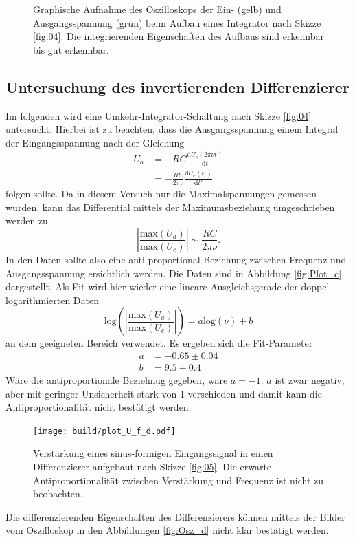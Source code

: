 \begin{figure}
\begin{subfigure}{0.35\textwidth}
  \end{subfigure}
  \caption{Graphische Aufnahme des Oszilloskops der Ein- (gelb) und Ausgangsspannung (grün) beim Aufbau eines Integrator nach Skizze \ref{fig:04}. Die integrierenden Eigenschaften des Aufbaus sind erkennbar bis gut erkennbar.}
  \label{fig:Osz_c}
\end{figure}

\subsection{Untersuchung des invertierenden Differenzierer}
Im folgenden wird eine Umkehr-Integrator-Schaltung nach Skizze \ref{fig:04} untersucht. Hierbei ist zu beachten, dass die Ausgangsspannung einem Integral der Eingangsspannung nach der Gleichung
\begin{align}
  U_a &= -RC\frac{\text{d}U_e(2\pi \nu t)}{\text{d}t}\\
      &= -\frac{RC}{2\pi\nu} \frac{\text{d}U_e(t')}{\text{d}t'}
\end{align}
folgen sollte. Da in diesem Versuch nur die Maximalspannungen gemessen wurden, kann das Differential mittels der Maximumsbeziehung umgeschrieben werden zu
\begin{equation}
  \left|\frac{\text{max}\left(U_a\right)}{\text{max}\left(U_e\right)}\right| \sim \frac{RC}{2\pi\nu}.
\end{equation}
In den Daten sollte also eine anti-proportional Beziehnug zwischen Frequenz und Ausgangsspannung ersichtlich werden. Die Daten sind in Abbildung \ref{fig:Plot_c} dargestellt. Als Fit wird hier wieder eine lineare Ausgleichsgerade der doppel-logarithmierten Daten
\begin{equation}
  \text{log}\left(\left|\frac{\text{max}\left(U_a\right)}{\text{max}\left(U_e\right)}\right|\right) = a\text{log}\left(\nu \right)+b
\end{equation}
an dem geeigneten Bereich verwendet. Es ergeben sich die Fit-Parameter
\begin{align}
  a &= -0.65\pm 0.04\\
  b &= 9.5\pm 0.4
\end{align}
Wäre die antiproportionale Beziehnug gegeben, wäre $a=-1$. $a$ ist zwar negativ, aber mit geringer Unsicherheit stark von 1 verschieden und damit kann die Antiproportionalität nicht bestätigt werden.

\begin{figure}
  \centering
  \texttt{[image: build/plot\_U\_f\_d.pdf]}
  \caption{Verstärkung eines sinus-förmigen Eingangssignal in einen Differenzierer aufgebaut nach Skizze \ref{fig:05}. Die erwarte Antiproportionalität zwischen Verstärkung und Frequenz ist nicht zu beobachten.}
  \label{fig:Plot_d}
\end{figure}
Die differenzierenden Eigenschaften des Differenzierers können mittels der Bilder vom Oszilloskop in den Abbildungen \ref{fig:Osz_d} nicht klar bestätigt werden.

